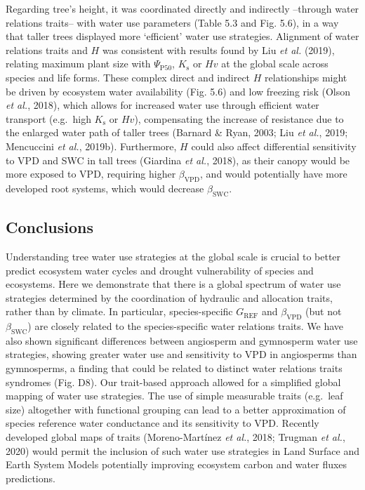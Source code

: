 \documentclass[11pt,twoside]{reedthesis}
\begin{document}
Regarding tree's height, it was coordinated directly and indirectly
--through water relations traits-- with water use parameters (Table 5.3
and Fig. 5.6), in a way that taller trees displayed more `efficient'
water use strategies. Alignment of water relations traits and \(H\) was
consistent with results found by Liu \emph{et al.} (2019), relating
maximum plant size with \(\Psi_{\text{P50}}\), \(K_\text{s}\) or \(Hv\)
at the global scale across species and life forms. These complex direct
and indirect \(H\) relationships might be driven by ecosystem water
availability (Fig. 5.6) and low freezing risk (Olson \emph{et al.},
2018), which allows for increased water use through efficient water
transport (e.g.~high \(K_\text{s}\) or \(Hv\)), compensating the
increase of resistance due to the enlarged water path of taller trees
(Barnard \& Ryan, 2003; Liu \emph{et al.}, 2019; Mencuccini \emph{et
al.}, 2019b). Furthermore, \(H\) could also affect differential
sensitivity to VPD and SWC in tall trees (Giardina \emph{et al.}, 2018),
as their canopy would be more exposed to VPD, requiring higher
\(\beta_{\text{VPD}}\), and would potentially have more developed root
systems, which would decrease \(\beta_{\text{SWC}}\).\par

\subsection{Conclusions}\label{conclusions}

Understanding tree water use strategies at the global scale is crucial
to better predict ecosystem water cycles and drought vulnerability of
species and ecosystems. Here we demonstrate that there is a global
spectrum of water use strategies determined by the coordination of
hydraulic and allocation traits, rather than by climate. In particular,
species-specific \(G_{\text{REF}}\) and \(\beta_{\text{VPD}}\) (but not
\(\beta_{\text{SWC}}\)) are closely related to the species-specific
water relations traits. We have also shown significant differences
between angiosperm and gymnosperm water use strategies, showing greater
water use and sensitivity to VPD in angiosperms than gymnosperms, a
finding that could be related to distinct water relations traits
syndromes (Fig. D8). Our trait-based approach allowed for a simplified
global mapping of water use strategies. The use of simple measurable
traits (e.g.~leaf size) altogether with functional grouping can lead to
a better approximation of species reference water conductance and its
sensitivity to VPD. Recently developed global maps of traits
(Moreno-Martínez \emph{et al.}, 2018; Trugman \emph{et al.}, 2020) would
permit the inclusion of such water use strategies in Land Surface and
Earth System Models potentially improving ecosystem carbon and water
fluxes predictions.\par
\end{document}

